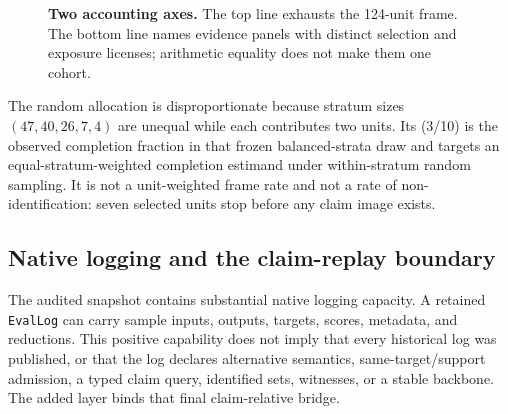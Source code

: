 \begin{figure}[ht]
\centering
{}
\caption{\textbf{Two accounting axes.} The top line exhausts the 124-unit frame.  The bottom line names evidence panels with distinct selection and exposure licenses; arithmetic equality does not make them one cohort.}
\label{fig:reviewer-frame-accounting}
\end{figure}

The random allocation is disproportionate because stratum sizes \((47,40,26,7,4)\) are unequal while each contributes two units.  Its (3/10) is the observed completion fraction in that frozen balanced-strata draw and targets an equal-stratum-weighted completion estimand under within-stratum random sampling.  It is not a unit-weighted frame rate and not a rate of non-identification: seven selected units stop before any claim image exists.

\subsection{Native logging and the claim-replay boundary}
\label{app:native-log-binding}

The audited snapshot contains substantial native logging capacity.  A retained \texttt{EvalLog} can carry sample inputs, outputs, targets, scores, metadata, and reductions.  This positive capability does not imply that every historical log was published, or that the log declares alternative semantics, same-target/support admission, a typed claim query, identified sets, witnesses, or a stable backbone.  The added layer binds that final claim-relative bridge.


